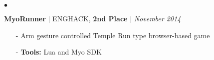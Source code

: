 \documentclass[11pt]{article}
\newenvironment{achievements}{\begin{list}{$\bullet$}{\topsep 0pt \itemsep -1.5pt \leftmargin 5pt}}{\vspace*{4pt}\end{list}}
\begin{document}
\begin{achievements}
\vspace{6pt}

\item\textbf{MyoRunner} {$|$ \scriptsize ENGHACK, \textbf{2nd Place} }  $|$  \href{https://github.com/nakulpathak3/myorunner}{\faGithub} \hfill \textit {November 2014}
\begin{itemize}
\item[-]Arm gesture controlled Temple Run type browser-based game
\vspace{3pt}
\item[-]\textbf{Tools:} Lua and Myo SDK
\end{itemize}







\end{achievements}
\end{document}
